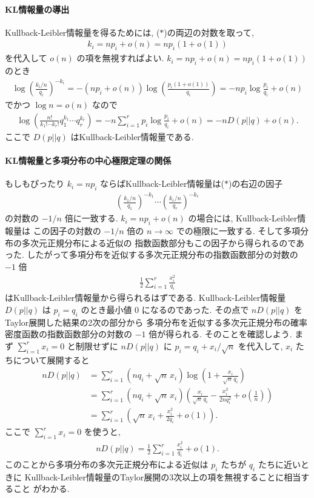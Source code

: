 \documentclass[12pt,twoside]{jarticle}
\theoremstyle{jplain}
\theoremstyle{jplain}
\theoremstyle{jplain}
\numberwithin{theorem}{section}
\numberwithin{equation}{section}
\numberwithin{figure}{section}
\numberwithin{table}{section}
\begin{document}
\paragraph{KL情報量の導出}
Kullback-Leibler情報量を得るためには, ($*$)の両辺の対数を取って, 
\begin{align*}
k_i = np_i + o(n) = np_i(1+o(1))
\end{align*}
を代入して $o(n)$ の項を無視すればよい.  $k_i=np_i+o(n)=np_i(1+o(1))$ のとき
\begin{align*}
\log\left(\frac{k_i/n}{q_i}\right)^{-k_i}
=-(np_i+o(n))\log\left(\frac{p_i(1+o(1))}{q_i}\right)
=-np_i\log\frac{p_i}{q_i}+o(n)
\end{align*}
でかつ $\log n=o(n)$ なので
\begin{align*}
\log\left(\frac{n!}{k_1!\cdots k_r!}q_1^{k_1}\cdots q_r^{k_r}\right)
=-n\sum_{i=1}^r p_i\log\frac{p_i}{q_i} + o(n)
=-n D(p||q)+o(n).
\end{align*}
ここで $D(p||q)$ はKullback-Leibler情報量である.


\paragraph{KL情報量と多項分布の中心極限定理の関係}
もしもぴったり $k_i=np_i$ ならばKullback-Leibler情報量は($*$)の右辺の因子
\begin{align*}
\left(\frac{k_1/n}{q_1}\right)^{-k_1}\cdots\left(\frac{k_r/n}{q_r}\right)^{-k_r}
\end{align*}
の対数の $-1/n$ 倍に一致する. 
$k_i=np_i+o(n)$ の場合には, Kullback-Leibler情報量は
この因子の対数の $-1/n$ 倍の $n\to\infty$ での極限に一致する.
そして多項分布の多次元正規分布による近似の
指数函数部分もこの因子から得られるのであった. 
したがって多項分布を近似する多次元正規分布の指数函数部分の対数の $-1$ 倍
\begin{align*}
\frac{1}{2}\sum_{i=1}^r \frac{x_i^2}{q_i}
\end{align*}
はKullback-Leibler情報量から得られるはずである. 
Kullback-Leibler情報量 $D(p||q)$ は $p_i=q_i$ のとき最小値 $0$ になるのであった.
その点で $n D(p||q)$ をTaylor展開した結果の2次の部分から
多項分布を近似する多次元正規分布の確率密度函数の指数函数部分の対数の $-1$ 倍が得られる.
そのことを確認しよう. まず $\sum_{i=1}^r x_i=0$ と制限せずに $nD(p||q)$ 
に $p_i=q_i+x_i/\sqrt{n}$ を代入して, $x_i$ たちについて展開すると
\begin{align*}
nD(p||q)
&
=\sum_{i=1}^r (nq_i+\sqrt{n}\,x_i)\log\left(1+\frac{x_i}{\sqrt{n}\,q_i}\right)
\\ &
=\sum_{i=1}^r (nq_i+\sqrt{n}\,x_i)
\left(
  \frac{x_i}{\sqrt{n}\,q_i}-\frac{x_i^2}{2nq_i^2}+o\left(\frac{1}{n}\right)
\right)
\\ &
=\sum_{i=1}^r
\left(
  \sqrt{n}\,x_i+\frac{x_i^2}{2q_i}+o(1)
\right).
\end{align*}
ここで $\sum_{i=1}^r x_i=0$ を使うと,
\begin{align*}
nD(p||q) = \frac{1}{2}\sum_{i=1}^r \frac{x_i^2}{q_i} + o(1).
\end{align*}
このことから多項分布の多次元正規分布による近似は $p_i$ たちが $q_i$ たちに近いときに
Kullback-Leibler情報量のTaylor展開の3次以上の項を無視することに相当すること
がわかる.
\end{document}
